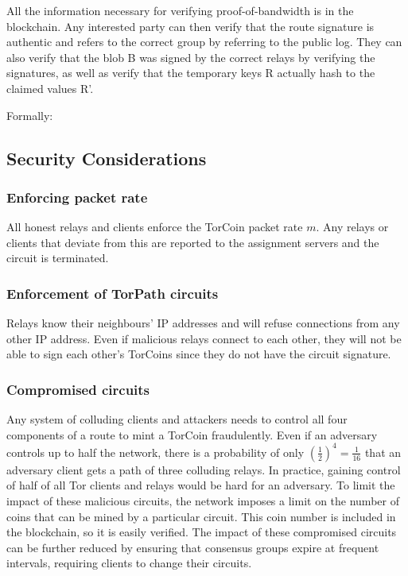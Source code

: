 All the information necessary for verifying proof-of-bandwidth is in the
blockchain. Any interested party can then verify that the route signature is
authentic and refers to the correct group by referring to the public log. They
can also verify that the blob B was signed by the correct relays by verifying
the signatures, as well as verify that the temporary keys R actually hash to
the claimed values R'.

Formally:

\subsection{Security Considerations}

\subsubsection{Enforcing packet rate} All honest relays and clients
enforce the TorCoin packet rate $m$. Any relays or clients that deviate from this
are reported to the assignment servers and the circuit is terminated.

\subsubsection{Enforcement of TorPath circuits} Relays know their neighbours'
IP addresses and will refuse connections from any other IP address. Even if
malicious relays connect to each other, they will not be able to sign each
other's TorCoins since they do not have the circuit signature.

\subsubsection{Compromised circuits} Any system of colluding clients and
attackers needs to control all four components of a route to mint a TorCoin
fraudulently. Even if an adversary controls up to half the network, there is a
probability of only $(\frac{1}{2})^4 = \frac{1}{16}$ that an adversary client
gets a path of three colluding relays. In practice, gaining control of half of
all Tor clients and relays would be hard for an adversary.  To limit the
impact of these malicious circuits, the network imposes a limit on the number
of coins that can be mined by a particular circuit. This coin number is
included in the blockchain, so it is easily verified. The impact of these
compromised circuits can be further reduced by ensuring that consensus groups
expire at frequent intervals, requiring clients to change their circuits.

